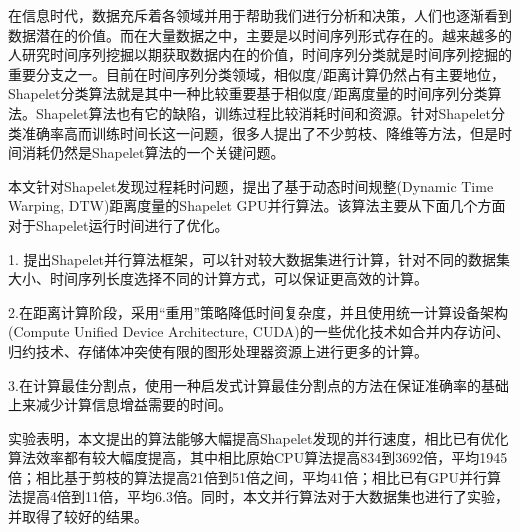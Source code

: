 \begin{cabstract}

在信息时代，数据充斥着各领域并用于帮助我们进行分析和决策，人们也逐渐看到数据潜在的价值。而在大量数据之中，主要是以时间序列形式存在的。越来越多的人研究时间序列挖掘以期获取数据内在的价值，时间序列分类就是时间序列挖掘的重要分支之一。目前在时间序列分类领域，相似度/距离计算仍然占有主要地位，Shapelet分类算法就是其中一种比较重要基于相似度/距离度量的时间序列分类算法。Shapelet算法也有它的缺陷，训练过程比较消耗时间和资源。针对Shapelet分类准确率高而训练时间长这一问题，很多人提出了不少剪枝、降维等方法，但是时间消耗仍然是Shapelet算法的一个关键问题。

本文针对Shapelet发现过程耗时问题，提出了基于动态时间规整(Dynamic Time Warping, DTW)距离度量的Shapelet GPU并行算法。该算法主要从下面几个方面对于Shapelet运行时间进行了优化。

1. 提出Shapelet并行算法框架，可以针对较大数据集进行计算，针对不同的数据集大小、时间序列长度选择不同的计算方式，可以保证更高效的计算。

2.在距离计算阶段，采用“重用”策略降低时间复杂度，并且使用统一计算设备架构(Compute Unified Device Architecture, CUDA)的一些优化技术如合并内存访问、归约技术、存储体冲突使有限的图形处理器资源上进行更多的计算。

3.在计算最佳分割点，使用一种启发式计算最佳分割点的方法在保证准确率的基础上来减少计算信息增益需要的时间。

实验表明，本文提出的算法能够大幅提高Shapelet发现的并行速度，相比已有优化算法效率都有较大幅度提高，其中相比原始CPU算法提高834到3692倍，平均1945倍；相比基于剪枝的算法提高21倍到51倍之间，平均41倍；相比已有GPU并行算法提高4倍到11倍，平均6.3倍。同时，本文并行算法对于大数据集也进行了实验，并取得了较好的结果。

 
 

\end{cabstract}


